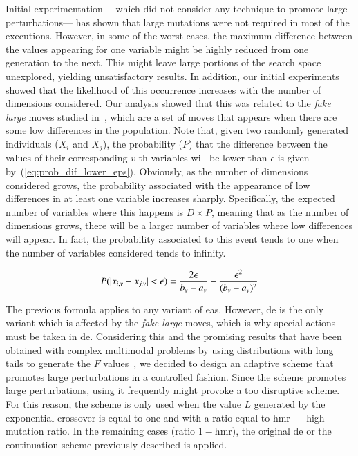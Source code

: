 \documentclass[review,3p]{elsarticle}
\newcommand{\EAS}{{\sc ea}s}
\newcommand{\DE}{{\sc de}}
\newcommand{\HMR}{{\sc hmr}}
\begin{document}
Initial experimentation ---which did not consider any technique to promote large perturbations---
has shown that large mutations were not required in most of the executions.
%
However, in some of the worst cases, the maximum difference between the values appearing for one variable might be
highly reduced from one generation to the next.
%
This might leave large portions of the search space unexplored, yielding unsatisfactory results.
%
In addition, our initial experiments showed that the likelihood of this occurrence increases with the
number of dimensions considered.
%
Our analysis showed that this was related to the \textit{fake large} moves studied in~\cite{Montgomery:09},
which are a set of moves that appears when there are some low differences in the population.
%
Note that, given two randomly generated individuals ($X_i$ and $X_j$), the probability ($P$) that the difference between the values
of their corresponding $v$-th variables will be lower than $\epsilon$ is given by~(\ref{eq:prob_dif_lower_eps}).
%
Obviously, as the number of dimensions considered grows, the probability associated with the appearance of low differences in at least one variable
increases sharply.
%
Specifically, the expected number of variables where this happens is $D \times P$, meaning that as the number of dimensions
grows, there will be a larger number of variables where low differences will appear.
%
In fact, the probability associated to this event tends to one when the number of variables considered tends to infinity.

\begin{equation}
	\label{eq:prob_dif_lower_eps}
		P(|x_{i,v} - x_{j,v}| < \epsilon) = {{2 \epsilon}\over{b_v - a_v}} - {{\epsilon^2}\over{({b_v - a_v})^2}}
\end{equation}
%

The previous formula applies to any variant of \EAS{}.
%
However, \DE{} is the only variant which is affected by the \textit{fake large} moves, which is why special actions
must be taken in \DE{}.
%
Considering this and the promising results that have been obtained with complex multimodal problems by using distributions with long tails to generate the $F$ values~\cite{Price:13},
we decided to design an adaptive scheme
that promotes large perturbations in a controlled fashion.
%
Since the scheme promotes large perturbations, using it frequently might provoke a too disruptive scheme.
%
For this reason, the scheme is only used when the value $L$ generated by the exponential crossover is equal to one
and with a ratio equal to \HMR{} --- high mutation ratio.
%
In the remaining cases (ratio $1 - $\HMR{}), the original \DE{} or the continuation scheme previously described is applied.
\end{document}
